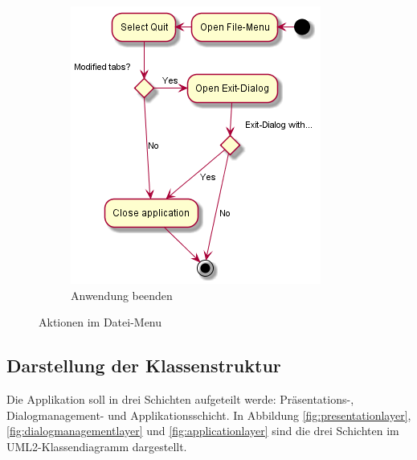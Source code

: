 \begin{figure}[H]
\begin{subfigure}[b]{0.4\linewidth}
        \includegraphics[width=\linewidth]{figures/quit/quit.png}
        \caption{Anwendung beenden}
    \end{subfigure}
    \caption{Aktionen im Datei-Menu}
    \label{fig:filemenu}
\end{figure}

\subsection{Darstellung der Klassenstruktur}
Die Applikation soll in drei Schichten aufgeteilt werde: Präsentations-, Dialogmanagement- und Applikationsschicht.
In Abbildung \ref{fig:presentationlayer}, \ref{fig:dialogmanagementlayer} und \ref{fig:applicationlayer} sind die
drei Schichten im UML2-Klassendiagramm dargestellt.

